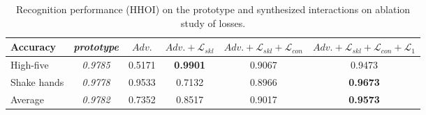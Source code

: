 \documentclass[times,twocolumn,final]{elsarticle}
\begin{document}
\begin{table*}[]
\small
\centering
\caption{Recognition performance (HHOI) on the prototype and synthesized interactions on ablation study of losses.}
\label{tab:2}
\begin{tabular}{|l|c|c|c|c|c|}
\hline
Accuracy                & \emph{prototype}              & $Adv.$ & $Adv.+\mathcal{L}_{skl}$ & $Adv.+\mathcal{L}_{skl}+\mathcal{L}_{con}$ & $Adv.+\mathcal{L}_{skl}+\mathcal{L}_{con}+\mathcal{L}_{1}$ \\ \hline
High-five   & \textit{0.9785} & 0.5171      & \textbf{0.9901}  & 0.9067                & 0.9473                   \\ 
Shake hands & \textit{0.9778} & 0.9533      & 0.7132           & 0.8966                & \textbf{0.9673}          \\ 
Average     & \textit{0.9782} & 0.7352      & 0.8517           & 0.9017                & \textbf{0.9573}          \\ \hline
\end{tabular}
\end{table*}
\end{document}
